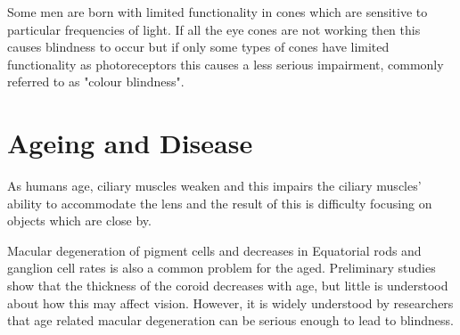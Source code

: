 
Some men are born with limited functionality in cones which are
sensitive to particular frequencies of light.\cite{george1996clinical}
If all the eye cones are not working then this causes blindness
to occur but if only some types of cones have limited functionality
as photoreceptors this causes a less serious impairment, commonly
referred to as "colour blindness".

\section{Ageing and Disease}

As humans age, ciliary muscles weaken and this impairs the ciliary
muscles' ability to accommodate the lens and the result of this is
difficulty focusing on objects which are close by.\cite{fisher1985ciliary}


Macular degeneration of pigment cells and decreases in Equatorial rods
and ganglion cell rates is also a common problem for the aged.
\cite{gao1992aging} Preliminary studies show that the thickness
of the coroid decreases with age, but little is understood about
how this may affect vision. \cite{margolis2009pilot} However, it is
widely understood by researchers that age related macular degeneration
can be serious enough to lead to blindness.\cite{klein2005complement}

